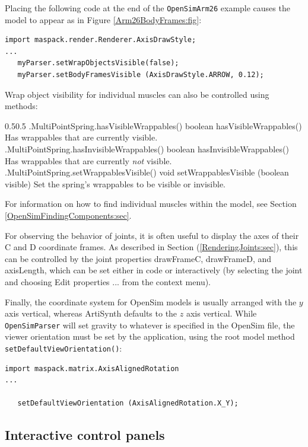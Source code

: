 Placing the following code at the end of the {\tt OpenSimArm26} example
causes the model to appear as in Figure \ref{Arm26BodyFrames:fig}:
%
\begin{lstlisting}[]
import maspack.render.Renderer.AxisDrawStyle;
...
   myParser.setWrapObjectsVisible(false);
   myParser.setBodyFramesVisible (AxisDrawStyle.ARROW, 0.12);
\end{lstlisting}
%
Wrap object visibility for individual muscles can also be controlled using
 methods:
%
\begin{methodtable}{0.5}{0.5}
\midline
%
\methodentry
{\mech.MultiPointSpring.hasVisibleWrappables()}%
{boolean hasVisibleWrappables()}%
{Has wrappables that are currently visible.}%
%
\methodentry
{\mech.MultiPointSpring.hasInvisibleWrappables()}%
{boolean hasInvisibleWrappables()}%
{Has wrappables that are currently {\it not} visible.}%
%
\methodentry
{\mech.MultiPointSpring.setWrappablesVisible()}%
{void setWrappablesVisible (boolean visible)}%
{Set the spring's wrappables to be visible or invisible.}%
%
\midline
\end{methodtable}
%
For information on how to find individual muscles within the model, see Section
\ref{OpenSimFindingComponents:sec}.

For observing the behavior of joints, it is often useful to display the axes
of their C and D coordinate frames. As described in Section
(\ref{RenderingJoints:sec}), this can be controlled by the joint properties
{\sf drawFrameC}, {\sf drawFrameD}, and {\sf axisLength}, which can be set
either in code or interactively (by selecting the joint and choosing {\sf Edit
properties ...} from the context menu).

Finally, the coordinate system for OpenSim models is usually arranged with the
$y$ axis vertical, whereas ArtiSynth defaults to the $z$ axis vertical.  While
{\tt OpenSimParser} will set gravity to whatever is specified in the OpenSim
file, the viewer orientation must be set by the application, using the root
model method {\tt setDefaultViewOrientation()}:
%
\begin{lstlisting}[]
import maspack.matrix.AxisAlignedRotation
...

   setDefaultViewOrientation (AxisAlignedRotation.X_Y);
\end{lstlisting}
%

\subsection{Interactive control panels}
\label{OpenSimPanels:sec}

